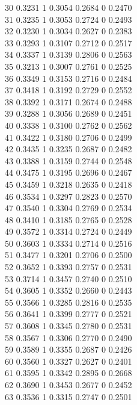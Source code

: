 \documentclass[
]{article}
\begin{document}
30 0.3231 1 0.3054 0.2684 0 0.2470\\
31 0.3235 1 0.3053 0.2724 0 0.2493\\
32 0.3230 1 0.3034 0.2627 0 0.2383\\
33 0.3293 1 0.3107 0.2712 0 0.2517\\
34 0.3337 1 0.3139 0.2806 0 0.2563\\
35 0.3213 1 0.3007 0.2761 0 0.2525\\
36 0.3349 1 0.3153 0.2716 0 0.2484\\
37 0.3418 1 0.3192 0.2729 0 0.2552\\
38 0.3392 1 0.3171 0.2674 0 0.2488\\
39 0.3288 1 0.3056 0.2689 0 0.2451\\
40 0.3338 1 0.3100 0.2762 0 0.2562\\
41 0.3422 1 0.3180 0.2706 0 0.2499\\
42 0.3435 1 0.3235 0.2687 0 0.2482\\
43 0.3388 1 0.3159 0.2744 0 0.2548\\
44 0.3475 1 0.3195 0.2696 0 0.2467\\
45 0.3459 1 0.3218 0.2635 0 0.2418\\
46 0.3534 1 0.3297 0.2823 0 0.2570\\
47 0.3540 1 0.3304 0.2769 0 0.2534\\
48 0.3410 1 0.3185 0.2765 0 0.2528\\
49 0.3572 1 0.3314 0.2724 0 0.2449\\
50 0.3603 1 0.3334 0.2714 0 0.2516\\
51 0.3477 1 0.3201 0.2706 0 0.2500\\
52 0.3652 1 0.3393 0.2757 0 0.2531\\
53 0.3714 1 0.3457 0.2740 0 0.2510\\
54 0.3605 1 0.3352 0.2660 0 0.2443\\
55 0.3566 1 0.3285 0.2816 0 0.2535\\
56 0.3641 1 0.3399 0.2777 0 0.2521\\
57 0.3608 1 0.3345 0.2780 0 0.2531\\
58 0.3567 1 0.3306 0.2770 0 0.2490\\
59 0.3589 1 0.3355 0.2687 0 0.2426\\
60 0.3560 1 0.3327 0.2627 0 0.2401\\
61 0.3595 1 0.3342 0.2895 0 0.2668\\
62 0.3690 1 0.3453 0.2677 0 0.2452\\
63 0.3536 1 0.3315 0.2747 0 0.2501\\
\end{document}
